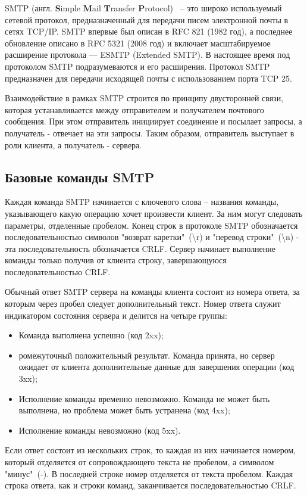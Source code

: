 \documentclass[a4paper,12pt]{report}
\begin{document}
SMTP (англ. \textbf{S}imple \textbf{M}ail \textbf{T}ransfer \textbf{P}rotocol) ~-- это широко используемый сетевой протокол, предназначенный для передачи писем электронной почты в сетях TCP/IP. SMTP впервые был описан в RFC 821 (1982 год), а последнее обновление описано в RFC 5321 (2008 год) и включает масштабируемое расширение протокола — ESMTP (Extended SMTP). В настоящее время под протоколом SMTP подразумеваются и его расширения. Протокол SMTP предназначен для передачи исходящей почты с использованием порта TCP 25.

Взаимодействие в рамках SMTP строится по принципу двусторонней связи, которая устанавливается между отправителем и получателем почтового сообщения. При этом отправитель инициирует соединение и посылает запросы, а получатель - отвечает на эти запросы. Таким образом, отправитель выступает в роли клиента, а получатель - сервера.


\subsection{Базовые команды SMTP}

Каждая команда SMTP начинается с ключевого слова – названия команды, указывающего какую операцию хочет произвести клиент. За ним могут следовать параметры, отделенные пробелом. Конец строк в протоколе SMTP обозначается последовательностью символов "возврат каретки"\ (\textbackslash r) и "перевод строки"\ (\textbackslash n) - эта последовательность обозначается CRLF. Сервер начинает выполнение команды только получив от клиента строку, завершающуюся последовательностью CRLF. 

Обычный ответ SMTP сервера на команды клиента состоит из номера ответа, за которым через пробел следует дополнительный текст. Номер ответа служит индикатором состояния сервера и делится на четыре группы:
\begin{itemize}
    \item Команда выполнена успешно (код 2xx);
    \item ромежуточный положительный результат. Команда принята, но сервер ожидает от клиента дополнительные данные для завершения операции (код 3xx);
    \item Исполнение команды временно невозможно. Команда не может быть выполнена, но проблема может быть устранена (код 4xx);
    \item Исполнение команды невозможно (код 5xx).
\end{itemize}

Если ответ состоит из нескольких строк, то каждая из них начинается номером, который отделяется от сопровождающего текста не пробелом, а символом "минус"\ (-). В последней строке номер отделяется от текста пробелом. Каждая строка ответа, как и строки команд, заканчивается последовательностью CRLF.
\end{document}
